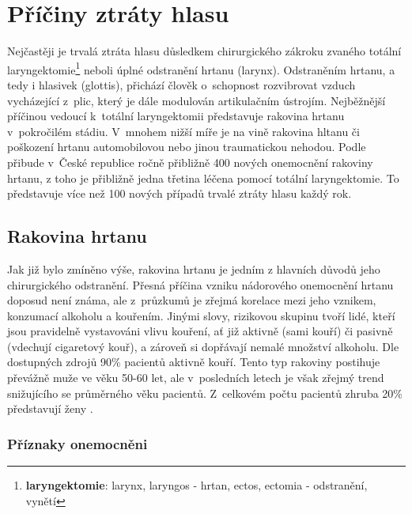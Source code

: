 \section{Příčiny ztráty hlasu}
\label{chap:cause:desease}

Nejčastěji je trvalá ztráta hlasu důsledkem chirurgického zákroku zvaného
totální laryngektomie\footnote{\textbf{laryngektomie}: larynx, laryngos -
hrtan, ectos, ectomia - odstranění, vynětí} neboli úplné odstranění hrtanu (larynx).
Odstraněním hrtanu, a tedy i hlasivek (glottis), přichází člověk o~schopnost
rozvibrovat vzduch vycházející z~plic, který je dále modulován artikulačním
ústrojím. Nejběžnější příčinou vedoucí  k~totální laryngektomii představuje
rakovina hrtanu v~pokročilém stádiu. V~mnohem nižší míře je na vině rakovina
hltanu či poškození hrtanu automobilovou nebo jinou traumatickou nehodou.
Podle \cite{Slavicek2000} přibude v~České republice ročně přibližně 400 nových
onemocnění rakoviny hrtanu, z toho je přibližně jedna třetina léčena pomocí
totální laryngektomie. To představuje více než 100 nových případů trvalé
ztráty hlasu každý rok.

\subsection{Rakovina hrtanu} %
\label{chap:cause:desease:cancer}

Jak již bylo zmíněno výše, rakovina hrtanu je jedním z hlavních důvodů jeho chirurgického odstranění.
Přesná příčina vzniku nádorového onemocnění hrtanu doposud není známa, ale
z~průzkumů je zřejmá korelace mezi jeho vznikem, konzumací alkoholu a
kouřením. Jinými slovy, rizikovou skupinu tvoří lidé, kteří jsou
pravidelně vystavováni vlivu kouření, ať již aktivně (sami kouří) či pasivně
(vdechují cigaretový kouř), a zároveň si dopřávají nemalé množství alkoholu.
Dle dostupných zdrojů %
90\% pacientů aktivně kouří.
Tento typ rakoviny postihuje převážně muže ve věku 50-60 let,
ale v~posledních letech je však zřejmý trend snižujícího se průměrného věku
pacientů. Z~celkovém počtu pacientů zhruba 20\%
představují ženy \cite{Skvrnakova2010}.



\subsubsection{Příznaky onemocněni} %
\label{chap:cause:desease:cancer:symptom}

